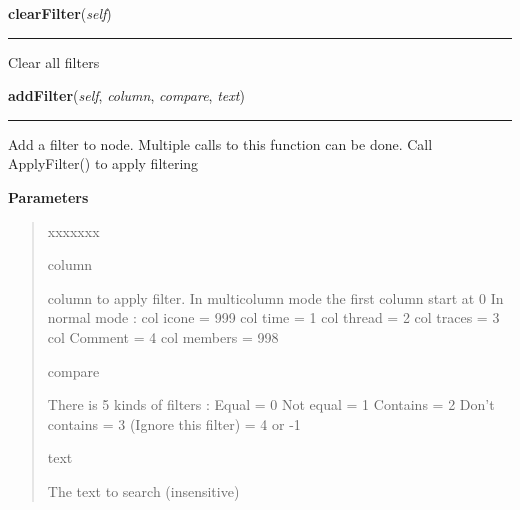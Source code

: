     \label{tracetool:WinTrace:clearFilter}

    \vspace{0.5ex}

\hspace{.8\funcindent}\begin{boxedminipage}{\funcwidth}

    \raggedright \textbf{clearFilter}(\textit{self})

    \vspace{-1.5ex}

    \rule{\textwidth}{0.5\fboxrule}
\setlength{\parskip}{2ex}
    Clear all filters

\setlength{\parskip}{1ex}
    \end{boxedminipage}

    \label{tracetool:WinTrace:addFilter}

    \vspace{0.5ex}

\hspace{.8\funcindent}\begin{boxedminipage}{\funcwidth}

    \raggedright \textbf{addFilter}(\textit{self}, \textit{column}, \textit{compare}, \textit{text})

    \vspace{-1.5ex}

    \rule{\textwidth}{0.5\fboxrule}
\setlength{\parskip}{2ex}
    Add a filter to node. Multiple calls to this function can be done. Call
    ApplyFilter() to apply filtering

\setlength{\parskip}{1ex}
      \textbf{Parameters}
      \vspace{-1ex}

      \begin{quote}
        \begin{Ventry}{xxxxxxx}

          \item[column]

          column to apply filter. In multicolumn mode the first column 
          start at 0 In normal mode : col icone   = 999 col time    = 1 col
          thread  = 2 col traces  = 3 col Comment = 4 col members = 998

          \item[compare]

          There is 5 kinds of filters : Equal           = 0 Not equal
          = 1 Contains        = 2 Don't contains  = 3 (Ignore this filter) 
          = 4 or -1

          \item[text]

          The text to search (insensitive)

        \end{Ventry}

      \end{quote}

    \end{boxedminipage}

